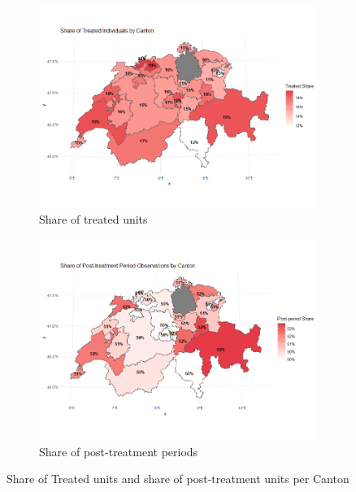 \documentclass{scrartcl}
\begin{document}
\begin{figure}[h!]
  \centering
  
  \begin{subfigure}[t]{0.48\textwidth}
    \centering
    \includegraphics[width=\linewidth]{output/figures/final_map_share_treated.png}
    \caption{Share of treated units}
    \label{fig:map_treated}
  \end{subfigure}
  \hfill
  \begin{subfigure}[t]{0.48\textwidth}
    \centering
    \includegraphics[width=\linewidth]{output/figures/final_map_post_share.png}
    \caption{Share of post-treatment periods}
    \label{fig:map_post}
  \end{subfigure}

  \caption{Share of Treated units and share of post-treatment units per Canton}
  \label{fig:combined2}
\end{figure}
\end{document}

